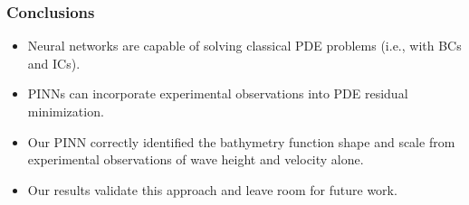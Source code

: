 \begin{frame}
    \frametitle{Conclusions}

    \begin{itemize}[<+->]
        \setlength\itemsep{2em}
        \item Neural networks are capable of solving classical PDE problems (i.e., with BCs and ICs).
        \item PINNs can incorporate experimental observations into PDE residual minimization.
        \item Our PINN correctly identified the bathymetry function shape and scale from experimental observations of 
              wave height and velocity alone.
        \item Our results validate this approach and leave room for future work.
    \end{itemize}
\end{frame}